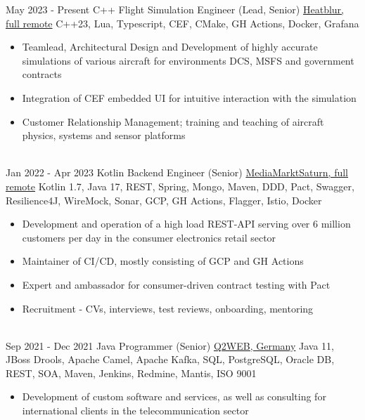 \documentclass[letterpaper]{twentysecondcv} %
\begin{document}
\begin{twenty} %
	\twentyitem
    		{May 2023 -}
		{Present}
        		{C++ Flight Simulation Engineer (Lead, Senior)}
        		{\href{https://store.heatblur.com/}{Heatblur, full remote}}
        		{C++23, Lua, Typescript, CEF, CMake, GH Actions, Docker, Grafana}
        		{\begin{itemize}
        			\item Teamlead, Architectural Design and Development of highly accurate simulations of various aircraft for environments DCS, MSFS
        			and government contracts
        			\item Integration of CEF embedded UI for intuitive interaction with the simulation
        			\item Customer Relationship Management; training and teaching of aircraft physics, systems and sensor platforms
        		\end{itemize}}\\
	\twentyitem
    		{Jan 2022 -}
		{Apr 2023}
        		{Kotlin Backend Engineer (Senior)}
        		{\href{https://www.mediamarktsaturn.com/}{MediaMarktSaturn, full remote}}
        		{Kotlin 1.7, Java 17, REST, Spring, Mongo, Maven, DDD, Pact, Swagger, Resilience4J, WireMock, Sonar, GCP, GH Actions, Flagger, Istio, Docker}
        		{\begin{itemize}
        			\item Development and operation of a high load REST-API serving over 6 million customers per day in the consumer electronics retail sector
        			\item Maintainer of CI/CD, mostly consisting of GCP and GH Actions
        			\item Expert and ambassador for consumer-driven contract testing with Pact
        			\item Recruitment - CVs, interviews, test reviews, onboarding, mentoring
        		\end{itemize}}\\
     	\twentyitem
    		{Sep 2021 -}
		{Dec 2021}
        		{Java Programmer (Senior)}
        		{\href{https://www.q2web.de/}{Q2WEB, Germany}}
        		{Java 11, JBoss Drools, Apache Camel, Apache Kafka, SQL, PostgreSQL, Oracle DB, REST, SOA, Maven, Jenkins, Redmine, Mantis, ISO 9001}
        		{\begin{itemize}
        			\item Development of custom software and services, as well as consulting for international clients in the telecommunication sector

\end{itemize}}
\end{twenty}
\end{document}
